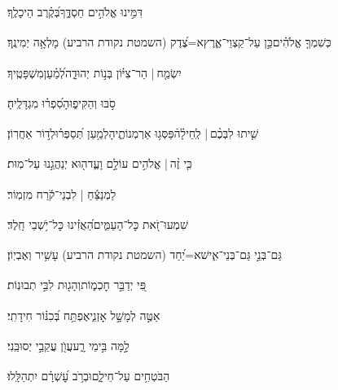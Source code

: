 \documentclass[12pt]{article}
\newcommand{\loc}[1]{\textsuperscript{\locf{#1}}}
\begin{document}
{\loc{ י}~}‏דִּמִּ֣ינוּ אֱלֹהִ֣ים חַסְדֶּ֑ךָ{\hfill}בְּ֝קֶ֗רֶב הֵיכָלֶֽךָ׃\par

{\loc{ יא}~}‏כְּשִׁמְךָ֤ אֱלֹהִ֗ים{\hfill}כֵּ֣ן \newline\hspace*{.5em}עַל־קַצְוֵי־אֶ֑רֶץ{\hfill}א=צֶ֝דֶק (השמטת נקודת הרביע) מָלְאָ֥ה יְמִינֶֽךָ׃\par

{\loc{ יב}~}‏יִשְׂמַ֤ח |  הַר־צִיּ֗וֹן{\hfill} בְּנ֣וֹת יְהוּדָ֑ה\newline\hspace*{.5em}לְ֝מַ֗עַן{\hfill}מִשְׁפָּטֶֽיךָ׃\par

{\loc{ יג}~}‏סֹ֣בּוּ  וְהַקִּיפ֑וּהָ{\hfill}סִ֝פְר֗וּ מִגְדָּלֶֽיהָ׃\par

{\loc{ יד}~}‏שִׁ֤יתוּ לִבְּכֶ֨ם |  לְֽחֵילָ֗הֿ{\hfill}פַּסְּג֥וּ אַרְמְנוֹתֶ֑יהָ\newline\hspace*{.5em}לְמַ֥עַן תְּ֝סַפְּר֗וּ{\hfill}לְד֣וֹר אַחֲרֽוֹן׃\par

{\loc{ טו}~}‏כִּ֤י זֶ֨ה |  אֱלֹהִ֣ים  עוֹלָ֣ם וָעֶ֑ד{\hfill}ה֖וּא יְנַהֲגֵ֣נוּ עַל־מֽוּת׃\par\pend
\ledpb
\pstart[\subsection*{\textcolor{red}{פרק מט}}]\label{פרק מט}
{\loc{ א}~}‏לַמְנַצֵּ֬חַ | לִבְנֵי־קֹ֬רַח מִזְמֽוֹר׃\par

{\loc{ ב}~}‏שִׁמְעוּ־זֹ֭את כׇּל־הָעַמִּ֑ים{\hfill}הַ֝אֲזִ֗ינוּ כׇּל־יֹ֥שְׁבֵי חָֽלֶד׃\par

{\loc{ ג}~}‏גַּם־בְּנֵ֣י  גַּם־בְּנֵי־אִ֑ישׁ{\hfill}א=יַ֝חַד (השמטת נקודת הרביע) עָשִׁ֥יר וְאֶבְיֽוֹן׃\par

{\loc{ ד}~}‏פִּ֭י יְדַבֵּ֣ר חׇכְמ֑וֹת{\hfill}וְהָג֖וּת לִבִּ֣י תְבוּנֽוֹת׃\par

{\loc{ ה}~}‏אַטֶּ֣ה לְמָשָׁ֣ל אׇזְנִ֑י{\hfill}אֶפְתַּ֥ח בְּ֝כִנּ֗וֹר חִידָתִֽי׃\par

{\loc{ ו}~}‏לָ֣מָּה  בִּ֣ימֵי רָ֑ע{\hfill}עֲוֺ֖ן עֲקֵבַ֣י יְסוּבֵּֽנִי׃\par

{\loc{ ז}~}‏הַבֹּטְחִ֥ים עַל־חֵילָ֑ם{\hfill}וּבְרֹ֥ב עׇ֝שְׁרָ֗ם יִתְהַלָּֽלוּ׃\par
\end{document}
